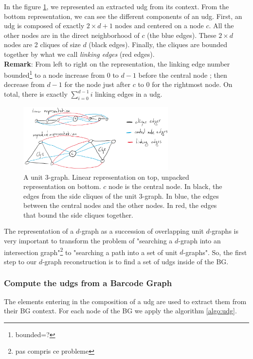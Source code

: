 In the figure \ref{fig:perfect_udg}, we represented an extracted udg from its context.
From the bottom representation, we can see the different components of an udg.
First, an udg is composed of exactly $2\times d + 1$ nodes and centered on a node $c$.
All the other nodes are in the direct neighborhood of $c$ (the blue edges).
These $2 \times d$ nodes are 2 cliques of size $d$ (black edges).
Finally, the cliques are bounded together by what we call \textit{linking edges} (red edges).\\
\textbf{Remark}: From left to right on the representation, the linking edge number bounded\footnote{bounded=?} to a node increase from 0 to $d-1$ before the central node ; then decrease from $d-1$ for the node just after $c$ to 0 for the rightmost node.
On total, there is exactly $\sum_{i=0}^{d-1}i$ linking edges in a udg.\\

\begin{figure}[htp]
    \centering
    \includegraphics[width=0.7\textwidth]{udg_composition.pdf}
    \caption{A unit 3-graph. Linear representation on top, unpacked representation on bottom. $c$ node is the central node. In black, the edges from the side cliques of the unit 3-graph. In blue, the edges between the central nodes and the other nodes. In red, the edges that bound the side cliques together.}
    \label{fig:perfect_udg}
\end{figure}

The representation of a $d$-graph as a succession of overlapping unit $d$-graphs is very important to transform the problem of "searching a $d$-graph into an intersection graph"\footnote{pas compris ce probleme} to "searching a path into a set of unit $d$-graphs".
So, the first step to our $d$-graph reconstruction is to find a set of udgs inside of the BG.

\subsubsection*{Compute the udgs from a Barcode Graph}

The elements entering in the composition of a udg are used to extract them from their BG context.
For each node of the BG we apply the algorithm \ref{algo:udg}.

